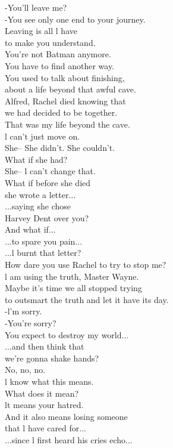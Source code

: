 \documentclass{article}
\begin{document}
\begin{multicols}{3}
-You'll leave me?\\
-You see only one end to your journey.\\
Leaving is all l have\\
to make you understand.\\
You're not Batman anymore.\\
You have to find another way.\\
You used to talk about finishing,\\
about a life beyond that awful cave.\\
Alfred, Rachel died knowing that\\
we had decided to be together.\\
That was my life beyond the cave.\\
l can't just move on.\\
She-- She didn't. She couldn't.\\
What if she had?\\
She-- l can't change that.\\
What if before she died\\
she wrote a letter...\\
...saying she chose\\
Harvey Dent over you?\\
And what if...\\
...to spare you pain...\\
...l burnt that letter?\\
How dare you use Rachel to try to stop me?\\
l am using the truth, Master Wayne.\\
Maybe it's time we all stopped trying\\
to outsmart the truth and let it have its day.\\
-l'm sorry.\\
-You're sorry?\\
You expect to destroy my world...\\
...and then think that\\
we're gonna shake hands?\\
No, no, no.\\
l know what this means.\\
What does it mean?\\
lt means your hatred.\\
And it also means losing someone\\
that l have cared for...\\
...since l first heard his cries echo...\\

\end{multicols}
\end{document}
